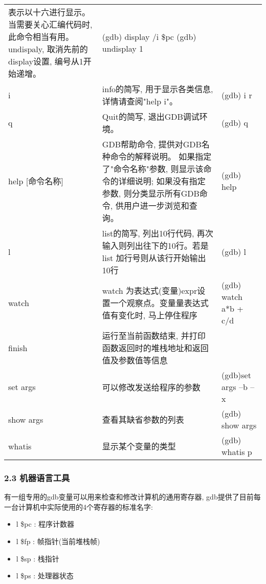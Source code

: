 \documentclass[
]{article}
\begin{document}
\begin{longtable}[]{@{}lll@{}}
表示以十六进行显示。当需要关心汇编代码时, 此命令相当有用。 undispaly,
取消先前的display设置, 编号从1开始递增。 & (gdb) display /i \$pc (gdb)
undisplay 1 \\
i & info的简写, 用于显示各类信息, 详情请查阅"help i"。 & (gdb) i r \\
q & Quit的简写, 退出GDB调试环境。 & (gdb) q \\
help {[}命令名称{]} & GDB帮助命令, 提供对GDB名种命令的解释说明。
如果指定了"命令名称"参数, 则显示该命令的详细说明; 如果没有指定参数,
则分类显示所有GDB命令, 供用户进一步浏览和查询。 & (gdb) help \\
l & list的简写, 列出10行代码, 再次输入则列出往下的10行。若是list
加行号则从该行开始输出10行 & (gdb) l \\
watch & watch 为表达式(变量)expr设置一个观察点。变量量表达式值有变化时,
马上停住程序 & (gdb) watch a*b + c/d \\
finish & 运行至当前函数结束,
并打印函数返回时的堆栈地址和返回值及参数值等信息 & \\
set args & 可以修改发送给程序的参数 & (gdb)set args --b --x \\
show args & 查看其缺省参数的列表 & (gdb) show args \\
whatis & 显示某个变量的类型 & (gdb) whatis p \\
\bottomrule()
\end{longtable}

\hypertarget{23-ux673aux5668ux8bedux8a00ux5de5ux5177}{%
\subsubsection{2.3
机器语言工具}\label{23-ux673aux5668ux8bedux8a00ux5de5ux5177}}

有一组专用的gdb变量可以用来检查和修改计算机的通用寄存器,
gdb提供了目前每一台计算机中实际使用的4个寄存器的标准名字:

\begin{itemize}
\item
  l \$pc : 程序计数器
\item
  l \$fp : 帧指针(当前堆栈帧)
\item
  l \$sp : 栈指针
\item
  l \$ps : 处理器状态
\end{itemize}
\end{document}
